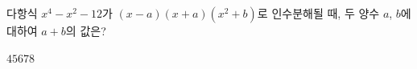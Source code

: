 다항식 $x^4-x^2-12$가 $(x-a)(x+a)(x^2+b)$로 인수분해될 때, 두 양수 $a$, $b$에 대하여 $a+b$의 값은?
\begin{choices32}{$4$}{$5$}{$6$}{$7$}{$8$}\end{choices32}
